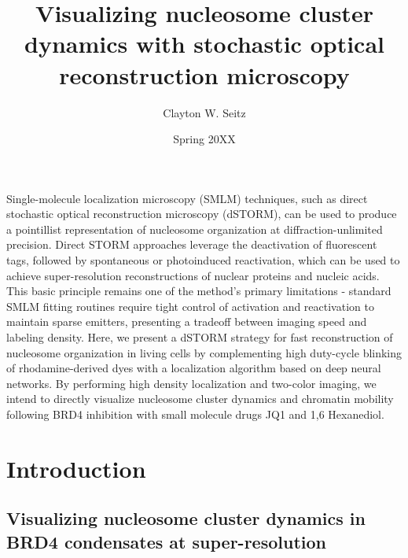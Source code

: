 \documentclass{ucetd}
\title{Visualizing nucleosome cluster dynamics with stochastic optical reconstruction microscopy}
\author{Clayton W. Seitz}
\date{Spring 20XX}
\begin{document}



\tableofcontents


\abstract

Single-molecule localization microscopy (SMLM) techniques, such as direct stochastic optical reconstruction microscopy (dSTORM), can be used to produce a pointillist representation of nucleosome organization at diffraction-unlimited precision. Direct STORM approaches leverage the deactivation of fluorescent tags, followed by spontaneous or photoinduced reactivation, which can be used to achieve super-resolution reconstructions of nuclear proteins and nucleic acids. This basic principle remains one of the method's primary limitations - standard SMLM fitting routines require tight control of activation and reactivation to maintain sparse emitters, presenting a tradeoff between imaging speed and labeling density. Here, we present a dSTORM strategy for fast reconstruction of nucleosome organization in living cells by complementing high duty-cycle blinking of rhodamine-derived dyes with a localization algorithm based on deep neural networks. By performing high density localization and two-color imaging, we intend to directly visualize nucleosome cluster dynamics and chromatin mobility following BRD4 inhibition with small molecule drugs JQ1 and 1,6 Hexanediol.


\clearpage

\mainmatter



\section{Introduction}

\subsection{Visualizing nucleosome cluster dynamics in BRD4 condensates at super-resolution}
\end{document}
